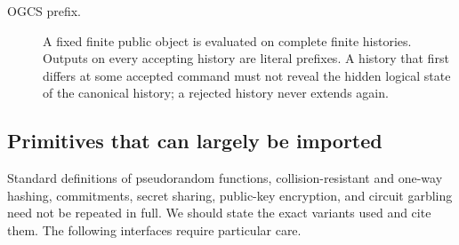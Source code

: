 \begin{description}
  \item[OGCS prefix.] A fixed finite public object is evaluated on complete
    finite histories.  Outputs on every accepting history are literal
    prefixes.  A history that first differs at some accepted command must not
    reveal the hidden logical state of the canonical history; a rejected
    history never extends again.
\end{description}

\subsection{Primitives that can largely be imported}

Standard definitions of pseudorandom functions, collision-resistant and
one-way hashing, commitments, secret sharing, public-key encryption, and
circuit garbling need not be repeated in full.  We should state the exact
variants used and cite them.  The following interfaces require particular
care.

